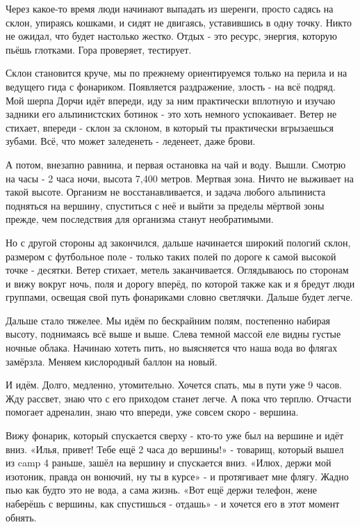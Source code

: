
Через какое-то время люди начинают выпадать из шеренги, просто садясь на склон,
упираясь кошками, и сидят не двигаясь, уставившись в одну точку. Никто не
ожидал, что будет настолько жестко. Отдых - это ресурс, энергия, которую пьёшь
глотками. Гора проверяет, тестирует. 

Склон становится круче, мы по прежнему ориентируемся только на перила и на
ведущего гида с фонариком. Появляется раздражение, злость - на всё подряд. Мой
шерпа Дорчи идёт впереди, иду за ним практически вплотную и изучаю задники его
альпинистских ботинок - это хоть немного успокаивает. Ветер не стихает, впереди
- склон за склоном, в который ты практически вгрызаешься зубами. Всё, что может
заледенеть - леденеет, даже брови. 

А потом, внезапно равнина, и первая остановка на чай и воду. Вышли. Смотрю на
часы - 2 часа ночи, высота 7,400 метров. Мертвая зона. Ничто не выживает на
такой высоте. Организм не восстанавливается, и задача любого альпиниста
подняться на вершину, спуститься с неё и выйти за пределы мёртвой зоны прежде,
чем последствия для организма станут необратимыми. 

Но с другой стороны ад закончился, дальше начинается широкий пологий склон,
размером с футбольное поле - только таких полей по дороге к самой высокой точке
- десятки. Ветер стихает, метель заканчивается. Оглядываюсь по сторонам и вижу
вокруг ночь, поля и дорогу вперёд, по которой также как и я бредут люди
группами, освещая свой путь фонариками словно светлячки. Дальше будет легче. 

Дальше стало тяжелее. Мы идём по бескрайним полям, постепенно набирая высоту,
поднимаясь всё выше и выше. Слева темной массой еле видны густые ночные облака.
Начинаю хотеть пить, но выясняется что наша вода во флягах замёрзла. Меняем
кислородный баллон на новый. 

И идём. Долго, медленно, утомительно. Хочется спать, мы в пути уже 9 часов. Жду
рассвет, знаю что с его приходом станет легче. А пока что терплю. Отчасти
помогает адреналин, знаю что впереди, уже совсем скоро - вершина. 

Вижу фонарик, который спускается сверху - кто-то уже был на вершине и идёт
вниз. «Илья, привет! Тебе ещё 2 часа до вершины!» - товарищ, который вышел из
camp 4 раньше, зашёл на вершину и спускается вниз. «Илюх, держи мой изотоник,
правда он вонючий, ну ты в курсе» - и протягивает мне флягу. Жадно пью как
будто это не вода, а сама жизнь. «Вот ещё держи телефон, жене наберёшь с
вершины, как спустишься - отдашь» - и хочется его в этот момент обнять. 

